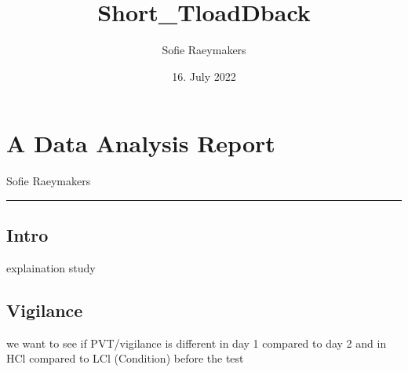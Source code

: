 \documentclass[
]{article}
\title{Short\_TloadDback}
\author{Sofie Raeymakers}
\date{16. July 2022}
\begin{document}
\maketitle

\hypertarget{a-data-analysis-report}{%
\section{A Data Analysis Report}\label{a-data-analysis-report}}

Sofie Raeymakers

\begin{center}\rule{0.5\linewidth}{0.5pt}\end{center}

\hypertarget{intro}{%
\subsection{Intro}\label{intro}}

explaination study

\hypertarget{vigilance}{%
\subsection{Vigilance}\label{vigilance}}

we want to see if PVT/vigilance is different in day 1 compared to day 2
and in HCl compared to LCl (Condition) before the test
\end{document}
